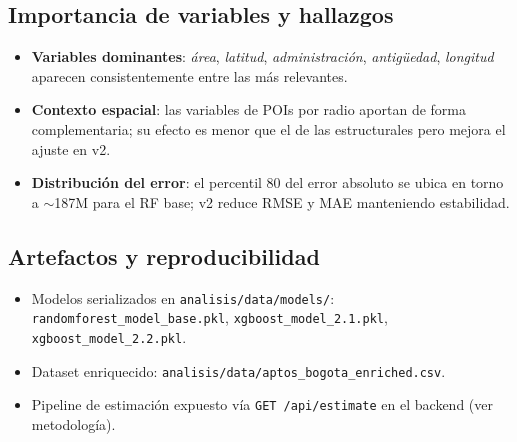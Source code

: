 \subsection{Importancia de variables y hallazgos}
\begin{itemize}
    \item \textbf{Variables dominantes}: \emph{área}, \emph{latitud}, \emph{administración}, \emph{antigüedad}, \emph{longitud} aparecen consistentemente entre las más relevantes.
    \item \textbf{Contexto espacial}: las variables de POIs por radio aportan de forma complementaria; su efecto es menor que el de las estructurales pero mejora el ajuste en v2.
    \item \textbf{Distribución del error}: el percentil 80 del error absoluto se ubica en torno a \(\sim\)187M para el RF base; v2 reduce RMSE y MAE manteniendo estabilidad.
\end{itemize}

\subsection{Artefactos y reproducibilidad}
\begin{itemize}
    \item Modelos serializados en \texttt{analisis/data/models/}: \texttt{randomforest\_model\_base.pkl}, \texttt{xgboost\_model\_2.1.pkl}, \texttt{xgboost\_model\_2.2.pkl}.
    \item Dataset enriquecido: \texttt{analisis/data/aptos\_bogota\_enriched.csv}.
    \item Pipeline de estimación expuesto vía \texttt{GET /api/estimate} en el backend (ver metodología).
\end{itemize}

